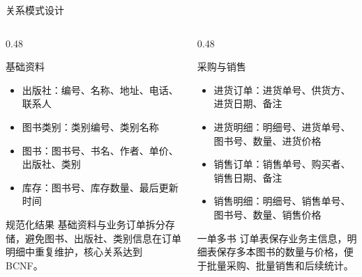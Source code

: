 \documentclass{beamer}
\begin{document}
\begin{frame}{关系模式设计}
  \begin{columns}[T,onlytextwidth]
    \begin{column}{0.48\textwidth}
      \begin{block}{基础资料}
        \scriptsize
        \begin{itemize}
          \item 出版社：编号、名称、地址、电话、联系人
          \item 图书类别：类别编号、类别名称
          \item 图书：图书号、书名、作者、单价、出版社、类别
          \item 库存：图书号、库存数量、最后更新时间
        \end{itemize}
      \end{block}
      \begin{block}{规范化结果}
        \scriptsize
        基础资料与业务订单拆分存储，避免图书、出版社、类别信息在订单明细中重复维护，核心关系达到 BCNF。
      \end{block}
    \end{column}
    \begin{column}{0.48\textwidth}
      \begin{block}{采购与销售}
        \scriptsize
        \begin{itemize}
          \item 进货订单：进货单号、供货方、进货日期、备注
          \item 进货明细：明细号、进货单号、图书号、数量、进货价格
          \item 销售订单：销售单号、购买者、销售日期、备注
          \item 销售明细：明细号、销售单号、图书号、数量、销售价格
        \end{itemize}
      \end{block}
      \begin{block}{一单多书}
        \scriptsize
        订单表保存业务主信息，明细表保存多本图书的数量与价格，便于批量采购、批量销售和后续统计。
      \end{block}
    \end{column}
  \end{columns}
\end{frame}
\end{document}

